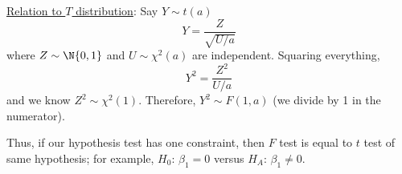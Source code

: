 \underline{Relation to $ T $ distribution}:
Say $ Y \sim t(a) $
\[ Y=\frac{Z}{\sqrt{U/a}}  \]
where $ Z \sim \N{0,1} $
and $ U \sim \chi^2(a) $ are independent.
Squaring everything,
\[ Y^2=\frac{Z^2}{U/a} \]
and we know $ Z^2 \sim \chi^2(1) $. Therefore,
$ Y^2 \sim F(1,a) $ (we divide by 1 in the numerator).

Thus, if our hypothesis test has one constraint,
then $ F $ test is equal to $ t $ test of same hypothesis;
for example, $ H_0 $: $ \beta_1=0 $ versus $ H_A $: $ \beta_1\neq 0 $.
